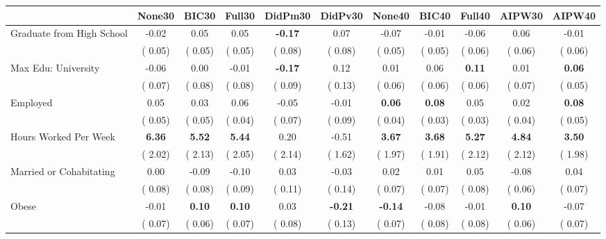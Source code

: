 \begin{tabular}{l c c c c c c c c c c}
\toprule
 & None30 & BIC30 & Full30 & DidPm30 & DidPv30 & None40 & BIC40 & Full40 & AIPW30 & AIPW40 \\
\midrule
Graduate from High School &     -0.02 &      0.05 &      0.05 & \textbf{     -0.17 } &      0.07 &     -0.07 &     -0.01 &     -0.06 &      0.06 &     -0.01 \\
& (     0.05) & (     0.05) & (     0.05) & (     0.08) & (     0.08) & (     0.05) & (     0.05) & (     0.06) & (     0.06) & (     0.06) \\
Max Edu: University &     -0.06 &      0.00 &     -0.01 & \textbf{     -0.17 } &      0.12 &      0.01 &      0.06 & \textbf{      0.11 } &      0.01 & \textbf{     0.06} \\
& (     0.07) & (     0.08) & (     0.08) & (     0.09) & (     0.13) & (     0.06) & (     0.06) & (     0.06) & (     0.07) & (     0.05) \\
Employed &      0.05 &      0.03 &      0.06 &     -0.05 &     -0.01 & \textbf{      0.06 } & \textbf{      0.08 } &      0.05 &      0.02 & \textbf{     0.08} \\
& (     0.05) & (     0.05) & (     0.04) & (     0.07) & (     0.09) & (     0.04) & (     0.03) & (     0.03) & (     0.04) & (     0.05) \\
Hours Worked Per Week & \textbf{      6.36 } & \textbf{      5.52 } & \textbf{      5.44 } &      0.20 &     -0.51 & \textbf{      3.67 } & \textbf{      3.68 } & \textbf{      5.27 } & \textbf{     4.84} & \textbf{     3.50} \\
& (     2.02) & (     2.13) & (     2.05) & (     2.14) & (     1.62) & (     1.97) & (     1.91) & (     2.12) & (     2.12) & (     1.98) \\
Married or Cohabitating &      0.00 &     -0.09 &     -0.10 &      0.03 &     -0.03 &      0.02 &      0.01 &      0.05 &     -0.08 &      0.04 \\
& (     0.08) & (     0.08) & (     0.09) & (     0.11) & (     0.14) & (     0.07) & (     0.07) & (     0.08) & (     0.06) & (     0.07) \\
Obese &     -0.01 & \textbf{      0.10 } & \textbf{      0.10 } &      0.03 & \textbf{     -0.21 } & \textbf{     -0.14 } &     -0.08 &     -0.01 & \textbf{     0.10} &     -0.07 \\
& (     0.07) & (     0.06) & (     0.07) & (     0.08) & (     0.13) & (     0.07) & (     0.08) & (     0.08) & (     0.06) & (     0.07) \\

\end{tabular}

